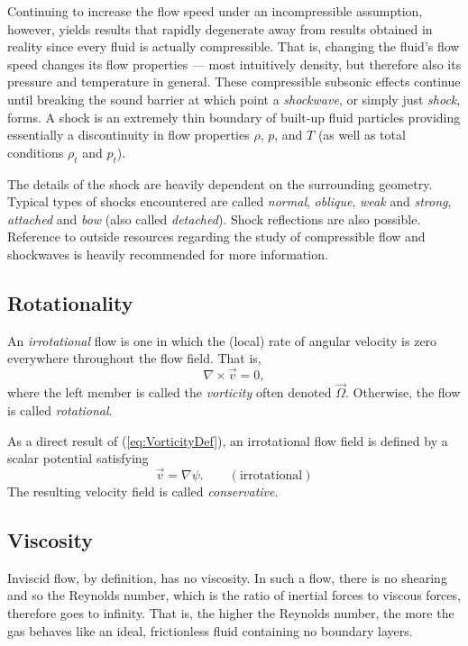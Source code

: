 \documentclass[11pt,dvipsnames]{thesis}
\begin{document}
Continuing to increase the flow speed under an incompressible assumption, however, yields results that rapidly degenerate away from results obtained in reality since every fluid is actually compressible. That is, changing the fluid's flow speed changes its flow properties --- most intuitively density, but therefore also its pressure and temperature in general. These compressible subsonic effects continue until breaking the sound barrier at which point a \textit{shockwave}, or simply just \textit{shock}, forms. A shock is an extremely thin boundary of built-up fluid particles providing essentially a discontinuity in flow properties $\rho$, $p$, and $T$ (as well as total conditions $\rho_t$ and $p_t$).

The details of the shock are heavily dependent on the surrounding geometry. Typical types of shocks encountered are called \textit{normal}, \textit{oblique}, \textit{weak} and \textit{strong}, \textit{attached} and \textit{bow} (also called \textit{detached}). Shock reflections are also possible.
%
Reference to outside resources regarding the study of compressible flow and shockwaves is heavily recommended for more information.

\subsection{Rotationality}
An \textit{irrotational} flow is one in which the (local) rate of angular velocity is zero everywhere throughout the flow field. That is,
\begin{equation}
\nabla \times \vec{v} = 0, \label{eq:VorticityDef}
\end{equation}
where the left member is called the \textit{vorticity} often denoted $\vec{\Omega}$.
Otherwise, the flow is called \textit{rotational}.

As a direct result of (\ref{eq:VorticityDef}), an irrotational flow field is defined by a scalar potential satisfying
\begin{equation}
\vec{v} = \nabla \psi. \qquad (\text{irrotational})
\end{equation}
The resulting velocity field is called \textit{conservative}.

\subsection{Viscosity}
Inviscid flow, by definition, has no viscosity. In such a flow, there is no shearing and so the Reynolds number, which is the ratio of inertial forces to viscous forces, therefore goes to infinity. That is, the higher the Reynolds number, the more the gas behaves like an ideal, frictionless fluid containing no boundary layers.
\end{document}

